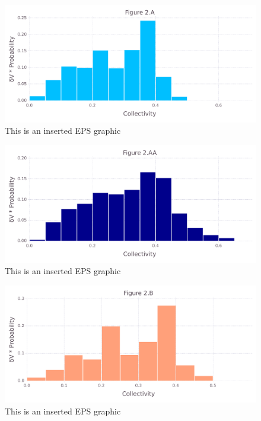 \documentclass[10pt,letterpaper]{article}
\begin{document}
\begin{figure}[ht]
\begin{center}
\includegraphics[scale=0.5]{1hvr_apo/2afigure_very_hi-precision.pdf}
\caption{This is an inserted EPS graphic}
\label{fig3}
\end{center}
\end{figure}

\begin{figure}[ht]
\begin{center}
\includegraphics[scale=0.5]{1hvr_apo/2aafigure_very_hi-precision.pdf}
\caption{This is an inserted EPS graphic}
\label{fig4}
\end{center}
\end{figure}

\begin{figure}[ht]
\begin{center}
\includegraphics[scale=0.5]{1hvr_apo/2bfigure_very_hi-precision.pdf}
\caption{This is an inserted EPS graphic}
\label{fig5}
\end{center}
\end{figure}
\end{document}
